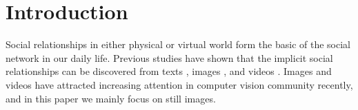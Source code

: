 \documentclass{article}
\begin{document}
\section{Introduction}
Social relationships in either physical or virtual world form the basic of the social network in our daily life. Previous studies have shown that the implicit social relationships can be discovered from texts \cite{article}, images \cite{DBLP:conf/iccv/LiWZK17,DBLP:conf/ijcai/WangCRYCL18,DBLP:conf/eccv/WangGLF10,DBLP:conf/iccv/ZhangLLT15}, and videos \cite{DBLP:conf/eccv/DingY10,DBLP:conf/cvpr/RamanathanY013,DBLP:journals/ivc/VinciarelliPB09}. Images and videos have attracted increasing attention in computer vision community recently, and in this paper we mainly focus on still images.
\end{document}
